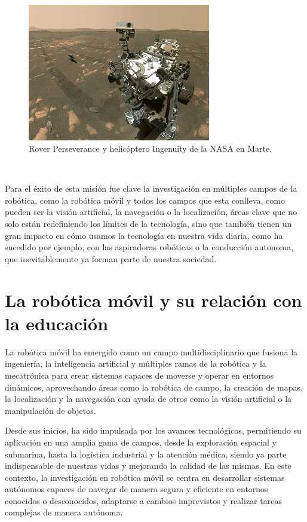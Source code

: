 \begin{figure} [h!]
  \begin{center}
    \includegraphics[width=8cm]{figs/perseverance_and_ingenuity_mars_rover_selfie}
  \end{center}
  \caption{Rover Perseverance y helicóptero Ingenuity de la NASA en Marte.}
  \label{fig:rover}
\end{figure}\

Para el éxito de esta misión fue clave la investigación en múltiples campos de
la robótica, como la robótica móvil y todos los campos que esta conlleva, como
pueden ser la visión artificial, la navegación o la localización, áreas clave
que no solo están redefiniendo los límites de la tecnología, sino que también
tienen un gran impacto en cómo usamos la tecnología en nuestra vida diaria, como
ha sucedido por ejemplo, con las aspiradoras robóticas o la conducción
autonoma, que inevitablemente ya forman parte de nuestra sociedad.



\section{La robótica móvil y su relación con la educación}
\label{sec:robotica_movil} %

La robótica móvil ha emergido como un campo multidisciplinario que fusiona la
ingeniería, la inteligencia artificial y múltiples ramas de la robótica y la
mecatrónica para crear sistemas capaces de moverse y operar en entornos
dinámicos, aprovechando áreas como la robótica de campo, la creación de mapas,
la localización y la navegación con ayuda de otros como la visión artificial o
la manipulación de objetos.

Desde sus inicios, ha sido impulsada por los avances tecnológicos, permitiendo
su aplicación en una amplia gama de campos, desde la exploración espacial y
submarina, hasta la logística industrial y la atención médica, siendo ya parte
indispensable de nuestras vidas y mejorando la calidad de las mismas.
En este contexto, la investigación en robótica móvil se centra en desarrollar
sistemas autónomos capaces de navegar de manera segura y eficiente en entornos
conocidos o desconocidos, adaptarse a cambios imprevistos y realizar tareas
complejas de manera autónoma.


